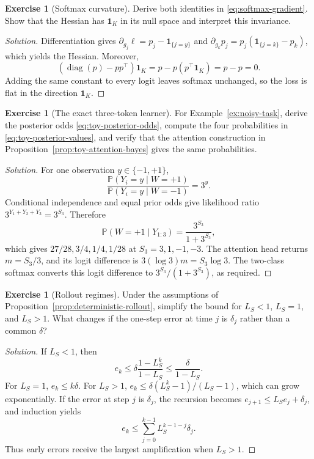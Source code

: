 \documentclass[11pt]{amsart}
\numberwithin{equation}{section}
\theoremstyle{definition}
\newtheorem{exercise}[definition]{Exercise}
\theoremstyle{plain}
\theoremstyle{remark}
\newcommand{\Prob}{\mathbb{P}}
\newcommand{\one}{\mathbf{1}}
\begin{document}
\begin{exercise}[Softmax curvature]
Derive both identities in \eqref{eq:softmax-gradient}.  Show that the Hessian
has $\one_K$ in its null space and interpret this invariance.
\end{exercise}

\begin{proof}[Solution]
Differentiation gives
$\partial_{g_j}\ell=p_j-\one_{\{j=y\}}$ and
$\partial_{g_k}p_j=p_j(\one_{\{j=k\}}-p_k)$, which yields the Hessian.
Moreover,
\[
 (\operatorname{diag}(p)-pp^\top)\one_K
 =p-p(p^\top\one_K)=p-p=0.
\]
Adding the same constant to every logit leaves softmax unchanged, so the loss
is flat in the direction $\one_K$.
\end{proof}

\begin{exercise}[The exact three-token learner]
For Example~\ref{ex:noisy-task}, derive the posterior odds
\eqref{eq:toy-posterior-odds}, compute the four probabilities in
\eqref{eq:toy-posterior-values}, and verify that the attention construction in
Proposition~\ref{prop:toy-attention-bayes} gives the same probabilities.
\end{exercise}

\begin{proof}[Solution]
For one observation $y\in\{-1,+1\}$,
\[
 \frac{\Prob(Y_i=y\mid W=+1)}{\Prob(Y_i=y\mid W=-1)}
 =3^y.
\]
Conditional independence and equal prior odds give likelihood ratio
$3^{Y_1+Y_2+Y_3}=3^{S_3}$.  Therefore
\[
 \Prob(W=+1\mid Y_{1:3})
 =\frac{3^{S_3}}{1+3^{S_3}},
\]
which gives $27/28,3/4,1/4,1/28$ at $S_3=3,1,-1,-3$.  The attention head
returns $m=S_3/3$, and its logit difference is
$3(\log3)m=S_3\log3$.  The two-class softmax converts this logit difference to
$3^{S_3}/(1+3^{S_3})$, as required.
\end{proof}

\begin{exercise}[Rollout regimes]
Under the assumptions of Proposition~\ref{prop:deterministic-rollout}, simplify
the bound for $L_S<1$, $L_S=1$, and $L_S>1$.  What changes if the one-step error
at time $j$ is $\delta_j$ rather than a common $\delta$?
\end{exercise}

\begin{proof}[Solution]
If $L_S<1$, then
\[
 e_k\le\delta\frac{1-L_S^k}{1-L_S}
 \le\frac{\delta}{1-L_S}.
\]
For $L_S=1$, $e_k\le k\delta$.  For $L_S>1$,
$e_k\le\delta(L_S^k-1)/(L_S-1)$, which can grow exponentially.  If the error
at step $j$ is $\delta_j$, the recursion becomes
$e_{j+1}\le L_Se_j+\delta_j$, and induction yields
\[
 e_k\le\sum_{j=0}^{k-1}L_S^{k-1-j}\delta_j.
\]
Thus early errors receive the largest amplification when $L_S>1$.
\end{proof}
\end{document}
